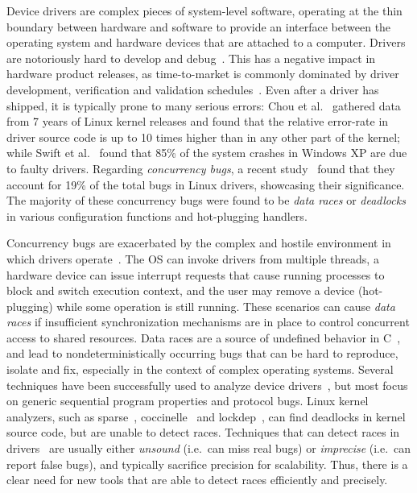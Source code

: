 Device drivers are complex pieces of system-level software, operating at the thin boundary between hardware and software to provide an interface between the operating system and hardware devices that are attached to a computer. Drivers are notoriously hard to develop and debug~\cite{corbet2005linux}. This has a negative impact in hardware product releases, as time-to-market is commonly dominated by driver development, verification and validation schedules~\cite{yavatkar2012era}.
%
Even after a driver has shipped, it is typically prone to many serious errors: Chou et al.~\cite{chou2001empirical} gathered data from 7 years of Linux kernel releases and found that the relative error-rate in driver source code is up to 10 times higher than in any other part of the kernel; while Swift et al.~\cite{Swift2003windowsxp} found that 85\% of the system crashes in Windows XP are due to faulty drivers. Regarding \emph{concurrency bugs}, a recent study~\cite{ryzhyk2009dingo} found that they account for 19\% of the total bugs in Linux drivers, showcasing their significance. The majority of these concurrency bugs were found to be \emph{data races} or \emph{deadlocks} in various configuration functions and hot-plugging handlers.

Concurrency bugs are exacerbated by the complex and hostile environment in which drivers operate~\cite{corbet2005linux}. The OS can invoke drivers from multiple threads, a hardware device can issue interrupt requests that cause running processes to block and switch execution context, and the user may remove a device (hot-plugging) while some operation is still running.  These scenarios can cause \emph{data races} if insufficient synchronization mechanisms are in place to control concurrent access to shared resources.
%
Data races are a source of undefined behavior in C~\cite[p.\ 38]{iso/iec11}, and lead to nondeterministically occurring bugs that can be hard to reproduce, isolate and fix, especially in the context of complex operating systems.
%
Several techniques have been successfully used to analyze device drivers~\cite{ball2006thorough, clarke2004predicate, engler2000checking, henzinger2002temporal, cook2006termination, kuznetsov2010testing, renzelmann2012symdrive, lal2012corral}, but most focus on generic sequential program properties and protocol bugs. Linux kernel analyzers, such as sparse~\cite{corbet2004sparse}, coccinelle~\cite{padioleau2008doc} and lockdep~\cite{corbet2006lock}, can find deadlocks in kernel source code, but are unable to detect races. Techniques that can detect races in drivers~\cite{dawson2003racerx, qadeer2004kiss, pratikakis2006locksmith, voung2007relay, lal2012corral} are usually either \emph{unsound} (i.e.\ can miss real bugs) or \emph{imprecise} (i.e.\ can report false bugs), and typically sacrifice precision for scalability. Thus, there is a clear need for new tools that are able to detect races efficiently and precisely.

